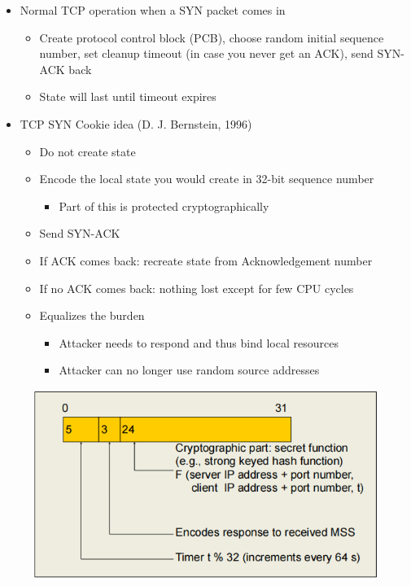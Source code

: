\documentclass[openany]{book}
\begin{document}
\begin{itemize}
    \item Normal TCP operation when a SYN packet comes in
    \begin{itemize}
        \item Create protocol control block (PCB), choose random initial sequence number, set cleanup timeout (in case you never get an ACK), send SYN-ACK back
        \item State will last until timeout expires
    \end{itemize}
    \item TCP SYN Cookie idea (D. J. Bernstein, 1996)
    \begin{itemize}
        \item Do not create state
        \item Encode the local state you would create in 32-bit sequence number
        \begin{itemize}
            \item Part of this is protected cryptographically
        \end{itemize}
        \item Send SYN-ACK
        \item If ACK comes back: recreate state from Acknowledgement number
        \item If no ACK comes back: nothing lost except for few CPU cycles
        \item Equalizes the burden
        \begin{itemize}
            \item Attacker needs to respond and thus bind local resources
            \item Attacker can no longer use random source addresses
        \end{itemize}
    \end{itemize}
\end{itemize}

\begin{figure}[h!]
    \centering
    \includegraphics[width=0.85\linewidth]{Pics/SYNCookie.PNG}
\end{figure}
\end{document}

